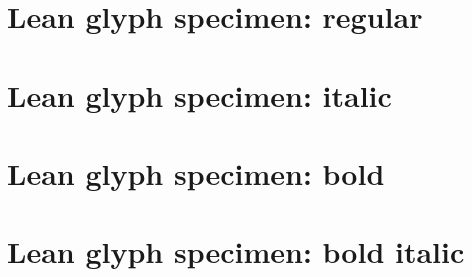 \documentclass{article}
\begin{document}
\section*{Lean glyph specimen: regular}
\begingroup
\normalfont

\endgroup

\clearpage
\section*{Lean glyph specimen: italic}
\begingroup
\normalfont\itshape

\endgroup

\clearpage
\section*{Lean glyph specimen: bold}
\begingroup
\normalfont\bfseries

\endgroup

\clearpage
\section*{Lean glyph specimen: bold italic}
\begingroup
\normalfont\bfseries\itshape

\endgroup
\end{document}
